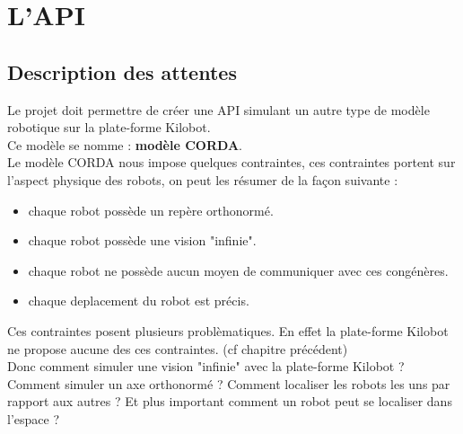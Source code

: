 \documentclass[a4paper,8pt]{report}
\begin{document}


\chapter{L'API}

\section*{Description des attentes}\label{sec:name}

Le projet doit permettre de cr\'eer une API simulant un autre type de mod\`ele robotique sur la plate-forme Kilobot.\\
Ce mod\`ele se nomme : \textbf{mod\`ele CORDA}.\\
Le mod\`ele CORDA nous impose quelques contraintes, ces contraintes portent sur l'aspect physique des robots, on peut les r\'esumer de la fa\c con suivante : \\

\begin{itemize}
\item chaque robot poss\`ede un rep\`ere orthonorm\'e.
\item chaque robot poss\`ede une vision "infinie".
\item chaque robot ne poss\`ede aucun moyen de communiquer avec ces cong\'en\`eres.
\item chaque deplacement du robot est pr\'ecis.
\end{itemize}

\medskip
Ces contraintes posent plusieurs probl\`ematiques. En effet la plate-forme Kilobot ne propose aucune des ces contraintes. (cf chapitre pr\'ec\'edent)\\
Donc comment simuler une vision "infinie" avec la plate-forme Kilobot ? Comment simuler un axe orthonorm\'e ? Comment localiser les robots les uns par rapport aux autres ? Et plus important comment un robot peut se localiser dans l'espace ?\\
\end{document}

